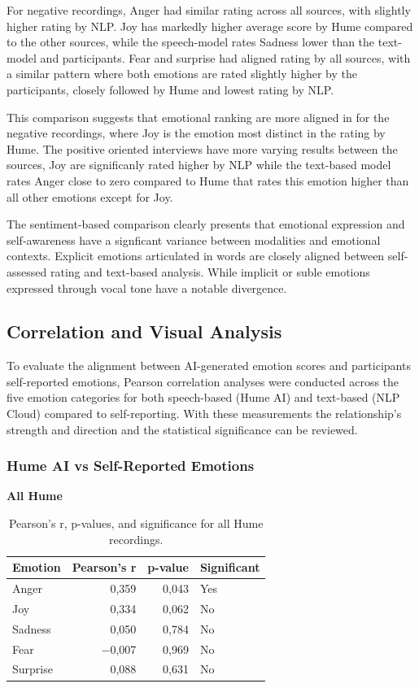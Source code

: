 For negative recordings, Anger had similar rating across all sources, with slightly higher rating by NLP.  Joy has markedly higher average score by Hume compared to the other sources, while the speech-model rates Sadness lower than the text-model and participants. 
Fear and surprise had aligned rating by all sources, with a similar pattern where both emotions are rated slightly higher by the participants, closely followed by Hume and lowest rating by NLP. 

This comparison suggests that emotional ranking are more aligned in for the negative recordings, where Joy is the emotion most distinct in the rating by Hume. 
The positive oriented interviews have more varying results between the sources, Joy are significanly rated higher by NLP while the text-based model rates Anger close to zero compared to Hume that rates this emotion higher than all other emotions except for Joy. 

The sentiment-based comparison clearly presents that emotional expression and self-awareness have a signficant variance between modalities and emotional contexts. 
Explicit emotions articulated in words are closely aligned between self-assessed rating and text-based analysis. 
While implicit or suble emotions expressed through vocal tone have a notable divergence. 

\subsection{Correlation and Visual Analysis}
To evaluate the alignment between AI-generated emotion scores and participants self-reported emotions, 
Pearson correlation analyses were conducted across the five emotion categories for both speech-based (Hume AI) and text-based (NLP Cloud) compared to self-reporting.
With these measurements the relationship's strength and direction and the statistical significance can be reviewed. 

\subsubsection{Hume AI vs Self-Reported Emotions}
\begin{table}[H]
    \centering
    \caption*{\textbf{All Hume}}
    \begin{tabular}{lrrl}
      \toprule
      \textbf{Emotion} & \textbf{Pearson’s r} & \textbf{p-value} & \textbf{Significant} \\
      \midrule
      Anger    & 0,359 & 0,043 & Yes \\
      Joy      & 0,334 & 0,062 & No  \\
      Sadness  & 0,050 & 0,784 & No  \\
      Fear     & \(-\)0,007 & 0,969 & No  \\
      Surprise & 0,088 & 0,631 & No  \\
      \bottomrule
    \end{tabular}
    \caption{Pearson’s r, p-values, and significance for all Hume recordings.}
    \label{tab:rq3_corr-hume-all}
  \end{table}

